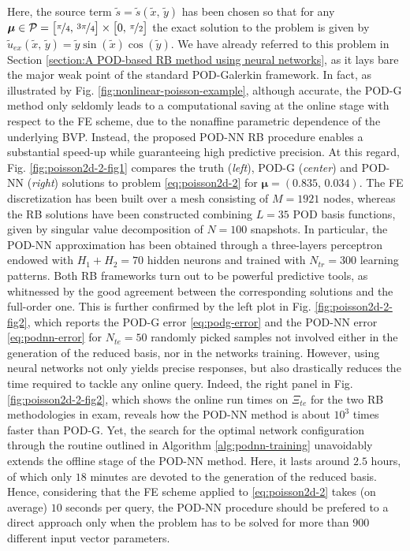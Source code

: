 \documentclass[12pt, a4paper, twoside, openright, notitlepage]{report}
\numberwithin{equation}{chapter}
\theoremstyle{theorem}
\theoremstyle{definition}
\theoremstyle{remark}
\theoremstyle{proposition}
\numberwithin{figure}{chapter}
\newcommand{\wt}[1]{\widetilde{#1}}
\newcommand{\bg}[1]{\boldsymbol{#1}}
\begin{document}
		Here, the source term $\wt{s} = \wt{s}(\wt{x}, \, \wt{y})$ has been chosen so that for any $\bg{\mu} \in \mathcal{P} = \big[ \nicefrac{\pi}{4}, \, \nicefrac{3 \pi}{4} \big] \times \big[ 0, \, \nicefrac{\pi}{2} \big]$ the exact solution to the problem is given by $\wt{u}_{ex}(\wt{x}, \, \wt{y}) = \wt{y} \sin(\wt{x}) \cos(\wt{y})$. We have already referred to this problem in Section \ref{section:A POD-based RB method using neural networks}, as it lays bare the major weak point of the standard POD-Galerkin framework. In fact, as illustrated by Fig. \ref{fig:nonlinear-poisson-example}, although accurate, the POD-G method only seldomly leads to a computational saving at the online stage with respect to the FE scheme, due to the nonaffine parametric dependence of the underlying BVP. Instead, the proposed POD-NN RB procedure enables a substantial speed-up while guaranteeing high predictive precision. At this regard, Fig. \ref{fig:poisson2d-2-fig1} compares the truth (\emph{left}), POD-G (\emph{center}) and POD-NN (\emph{right}) solutions to problem \eqref{eq:poisson2d-2} for $\bg{\mu} = (0.835, \, 0.034)$. The FE discretization has been built over a mesh consisting of $M = 1921$ nodes, whereas the RB solutions have been constructed combining $L = 35$ POD basis functions, given by singular value decomposition of $N = 100$ snapshots. In particular, the POD-NN approximation has been obtained through a three-layers perceptron endowed with $H_1 + H_2 = 70$ hidden neurons and trained with $N_{tr} = 300$ learning patterns. Both RB frameworks turn out to be powerful predictive tools, as whitnessed by the good agreement between the corresponding solutions and the full-order one. This is further confirmed by the left plot in Fig. \ref{fig:poisson2d-2-fig2}, which reports the POD-G error \eqref{eq:podg-error} and the POD-NN error \eqref{eq:podnn-error} for $N_{te} = 50$ randomly picked samples not involved either in the generation of the reduced basis, nor in the networks training. However, using neural networks not only yields precise responses, but also drastically reduces the time required to tackle any online query. Indeed, the right panel in Fig. \ref{fig:poisson2d-2-fig2}, which shows the online run times on $\Xi_{te}$ for the two RB methodologies in exam, reveals how the POD-NN method is about $10^3$ times faster than POD-G. Yet, the search for the optimal network configuration through the routine outlined in Algorithm \ref{alg:podnn-training} unavoidably extends the offline stage of the POD-NN method. Here, it lasts around $2.5$ hours, of which only $18$ minutes are devoted to the generation of the reduced basis. Hence, considering that the FE scheme applied to \eqref{eq:poisson2d-2} takes (on average) $10$ seconds per query, the POD-NN procedure should be prefered to a direct approach only when the problem has to be solved for more than $900$ different input vector parameters.
				
\end{document}

